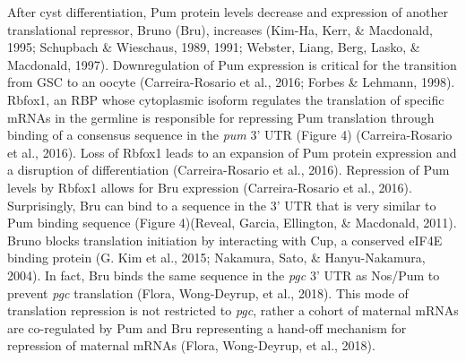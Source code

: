 \documentclass[12pt,oneside]{reedthesis}
\begin{document}
After cyst differentiation, Pum protein levels decrease and expression
of another translational repressor, Bruno (Bru), increases
(Kim-Ha, Kerr, \& Macdonald, 1995; Schupbach \& Wieschaus, 1989, 1991; Webster, Liang, Berg, Lasko, \& Macdonald, 1997). Downregulation of Pum expression is
critical for the transition from GSC to an oocyte
(Carreira-Rosario et al., 2016; Forbes \& Lehmann, 1998). Rbfox1, an RBP whose
cytoplasmic isoform regulates the translation of specific mRNAs in the
germline is responsible for repressing Pum translation through binding
of a consensus sequence in the \emph{pum} 3' UTR (Figure 4)
(Carreira-Rosario et al., 2016). Loss of Rbfox1 leads to an expansion of Pum
protein expression and a disruption of differentiation
(Carreira-Rosario et al., 2016). Repression of Pum levels by Rbfox1 allows
for Bru expression (Carreira-Rosario et al., 2016). Surprisingly, Bru can
bind to a sequence in the 3' UTR that is very similar to Pum binding
sequence (Figure 4)(Reveal, Garcia, Ellington, \& Macdonald, 2011). Bruno blocks translation
initiation by interacting with Cup, a conserved eIF4E binding protein
(G. Kim et al., 2015; Nakamura, Sato, \& Hanyu-Nakamura, 2004). In fact, Bru binds the same sequence in
the \emph{pgc} 3' UTR as Nos/Pum to prevent \emph{pgc} translation
(Flora, Wong-Deyrup, et al., 2018). This mode of translation repression is not restricted
to \emph{pgc}, rather a cohort of maternal mRNAs are co-regulated by Pum and
Bru representing a hand-off mechanism for repression of maternal mRNAs
(Flora, Wong-Deyrup, et al., 2018).
\end{document}
